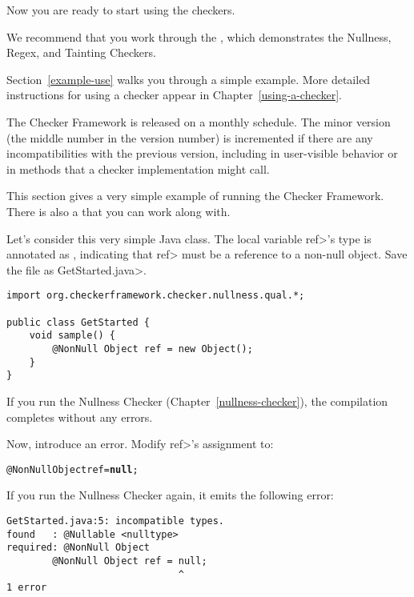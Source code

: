 Now you are ready to start using the checkers.

We recommend that you work through the
, which demonstrates the Nullness, Regex, and Tainting Checkers.

Section~\ref{example-use} walks you through a simple example.  More detailed
instructions for using a checker appear in Chapter~\ref{using-a-checker}.

\label{version-number}
The Checker Framework is released on a monthly schedule.  The minor version
(the middle number in the version number) is incremented if there are any
incompatibilities
with the previous version, including in user-visible
behavior or in methods that a checker implementation might call.



This section gives a very simple example of running the Checker Framework.
There is also a 
that you can work along with.

  Let's consider this very simple Java class.  The local variable \<ref>'s type is
  annotated as , indicating that \<ref> must be a reference to a
  non-null object.  Save the file as \<GetStarted.java>.

\begin{Verbatim}
import org.checkerframework.checker.nullness.qual.*;

public class GetStarted {
    void sample() {
        @NonNull Object ref = new Object();
    }
}
\end{Verbatim}

If you run the Nullness Checker (Chapter~\ref{nullness-checker}), the
compilation completes without any errors.

Now, introduce an error.  Modify \<ref>'s assignment to:
\begin{alltt}
  @NonNull Object ref = \textbf{null};
\end{alltt}

If you run the Nullness Checker again, it emits
  the following error:
\begin{Verbatim}
GetStarted.java:5: incompatible types.
found   : @Nullable <nulltype>
required: @NonNull Object
        @NonNull Object ref = null;
                              ^
1 error
\end{Verbatim}

